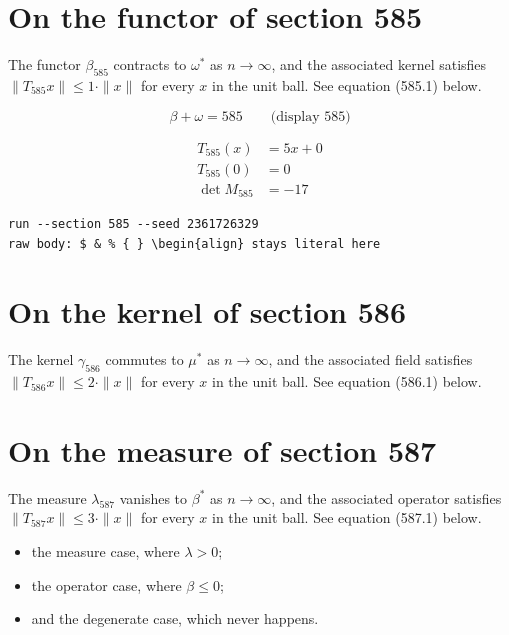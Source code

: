 \documentclass{article}
\begin{document}
\section{On the functor of section 585}
The functor $\beta_{585}$ contracts to $\omega^{*}$ as $n \to \infty$,
and the associated kernel satisfies $\|T_{585} x\| \leq 1 \cdot \|x\|$
for every $x$ in the unit ball. See equation (585.1) below.

$$
\beta + \omega = 585 \qquad \text{(display 585)}
$$

\begin{align}
T_{585}(x) &= 5 x + 0 \\
T_{585}(0) &= 0 \\
\det M_{585} &= -17
\end{align}

\begin{verbatim}
run --section 585 --seed 2361726329
raw body: $ & % { } \begin{align} stays literal here
\end{verbatim}

\section{On the kernel of section 586}
The kernel $\gamma_{586}$ commutes to $\mu^{*}$ as $n \to \infty$,
and the associated field satisfies $\|T_{586} x\| \leq 2 \cdot \|x\|$
for every $x$ in the unit ball. See equation (586.1) below.

\section{On the measure of section 587}
The measure $\lambda_{587}$ vanishes to $\beta^{*}$ as $n \to \infty$,
and the associated operator satisfies $\|T_{587} x\| \leq 3 \cdot \|x\|$
for every $x$ in the unit ball. See equation (587.1) below.

\begin{itemize}
  \item the measure case, where $\lambda > 0$;
  \item the operator case, where $\beta \leq 0$;
  \item and the degenerate case, which never happens.
\end{itemize}
\end{document}
